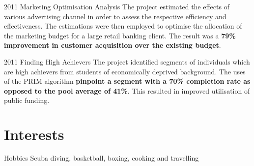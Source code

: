 \documentclass{tccv}
\begin{document}
\begin{yearlist}


  
\item{2011} {Marketing Optimisation Analysis} {The project estimated the effects of
  various advertising channel in order to assess the respective
  efficiency and effectiveness. The estimations were then employed to
  optimise the allocation of the marketing budget for a large retail
  banking client. The result was a \textbf{79\% improvement in
    customer acquisition over the existing budget}.}

\end{yearlist}

\begin{yearlist}
\item{2011}
     {Finding High Achievers}
     {The project identified segments of individuals which are high
       achievers from students of economically deprived
       background. The uses of the PRIM algorithm \textbf{pinpoint a
         segment with a 70\% completion rate as opposed to the pool
         average of 41\%}. This resulted in improved utilisation of
       public funding.}
  
\end{yearlist}


\section{Interests}

\begin{factlist}
\item{Hobbies} {Scuba diving, basketball, boxing, cooking and
  travelling}
\end{factlist}
\end{document}
